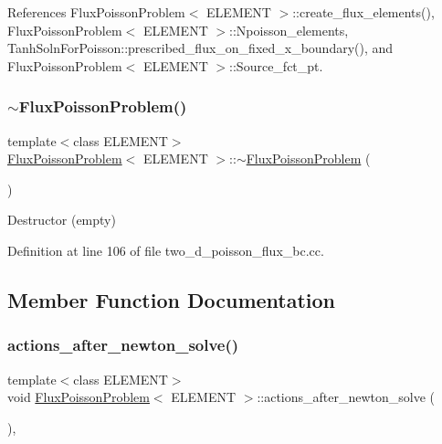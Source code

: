 References Flux\+Poisson\+Problem$<$ E\+L\+E\+M\+E\+N\+T $>$\+::create\+\_\+flux\+\_\+elements(), Flux\+Poisson\+Problem$<$ E\+L\+E\+M\+E\+N\+T $>$\+::\+Npoisson\+\_\+elements, Tanh\+Soln\+For\+Poisson\+::prescribed\+\_\+flux\+\_\+on\+\_\+fixed\+\_\+x\+\_\+boundary(), and Flux\+Poisson\+Problem$<$ E\+L\+E\+M\+E\+N\+T $>$\+::\+Source\+\_\+fct\+\_\+pt.

\mbox{\label{classFluxPoissonProblem_afe4848aa1478883fa4dd59abbd7c7547}} 
\subsubsection{\texorpdfstring{$\sim$\+Flux\+Poisson\+Problem()}{~FluxPoissonProblem()}}
{\footnotesize\ttfamily template$<$class E\+L\+E\+M\+E\+NT$>$ \\
\hyperlink{classFluxPoissonProblem}{Flux\+Poisson\+Problem}$<$ E\+L\+E\+M\+E\+NT $>$\+::$\sim$\hyperlink{classFluxPoissonProblem}{Flux\+Poisson\+Problem} (\begin{DoxyParamCaption}{ }\end{DoxyParamCaption})\hspace{0.3cm}{\ttfamily [inline]}}



Destructor (empty) 



Definition at line 106 of file two\+\_\+d\+\_\+poisson\+\_\+flux\+\_\+bc.\+cc.



\subsection{Member Function Documentation}
\mbox{\label{classFluxPoissonProblem_aa52ae9abbe805520a697929ab115f114}} 
\subsubsection{\texorpdfstring{actions\+\_\+after\+\_\+newton\+\_\+solve()}{actions\_after\_newton\_solve()}}
{\footnotesize\ttfamily template$<$class E\+L\+E\+M\+E\+NT$>$ \\
void \hyperlink{classFluxPoissonProblem}{Flux\+Poisson\+Problem}$<$ E\+L\+E\+M\+E\+NT $>$\+::actions\+\_\+after\+\_\+newton\+\_\+solve (\begin{DoxyParamCaption}{ }\end{DoxyParamCaption})\hspace{0.3cm}{\ttfamily [inline]}, {\ttfamily [private]}}



